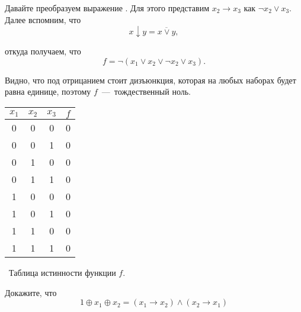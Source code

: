 \begin{solution}

\begin{paracol}{2}

	Давайте преобразуем выражение . 
	Для этого представим $x_2\rightarrow x_3$ как 
	$\neg x_2 \vee x_3$. Далее вспомним, что
	$$x\downarrow y = \overline{x\vee y},$$
	
	\noindent откуда получаем, что
	$$f = \neg(x_1\vee x_2 \vee \neg x_2 \vee x_3).$$

	Видно, что под отрицанием стоит дизъюнкция,
	которая на любых наборах будет равна единице,
	поэтому $f$~---~тождественный ноль.

\switchcolumn
		
\begin{center}
 \begin{tabular}{| c c c | c |}
  \hline	
 $x_1$ & $x_2$ & $x_3$ & $f$ \T\B \\
  \hline\hline
  0 & 0 & 0 & 0 \T\B \\ 
  0 & 0 & 1 & 0 \B \\
  0 & 1 & 0 & 0 \B \\
  0 & 1 & 1 & 0 \B \\
  1 & 0 & 0 & 0 \B \\
  1 & 0 & 1 & 0 \B \\
  1 & 1 & 0 & 0 \B \\
  1 & 1 & 1 & 0 \B \\
  \hline
 \end{tabular}
 \vspace{1cm}
 
 \
 \small Таблица истинности функции $f$.
\end{center}

\end{paracol}
\end{solution}

\begin{exercise}
Докажите, что 
\begin{equation}
		1\oplus x_1\oplus x_2=(x_1\rightarrow x_2)\wedge(x_2\rightarrow x_1)
\end{equation}

\end{exercise}

